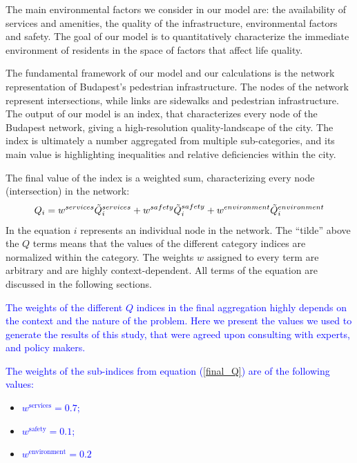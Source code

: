 The main environmental factors we consider in our model are: the availability of services and amenities, the quality of the infrastructure, environmental factors and safety. The goal of our model is to quantitatively characterize the immediate environment of residents in the space of factors that affect life quality.

The fundamental framework of our model and our calculations is the network representation of Budapest’s pedestrian infrastructure. The nodes of the network represent intersections, while links are sidewalks and pedestrian infrastructure. The output of our model is an index, that characterizes every node of the Budapest network, giving a high-resolution quality-landscape of the city. The index is ultimately a number aggregated from multiple sub-categories, and its main value is highlighting inequalities and relative deficiencies within the city.

The final value of the index is a weighted sum, characterizing every node (intersection) in the network:
\begin{equation} \label{final_Q}
	Q_i =w^{services}\Tilde{Q}_i^{services} + w^{safety} \Tilde{Q}_i^{safety} + w^{environment}\Tilde{Q}_i^{environment}
\end{equation}
In the equation $i$ represents an individual node in the network. The ``tilde'' above the $Q$ terms means that the values of the different category indices are normalized within the category. The weights $w$ assigned to every term are arbitrary and are highly context-dependent. All terms of the equation are discussed in the following sections.

\textcolor{blue}{The weights of the different $Q$ indices in the final aggregation highly depends on the context and the nature of the problem. Here we present the values we used to generate the results of this study, that were agreed upon consulting with experts, and policy makers.}

\textcolor{blue}{The weights of the sub-indices from equation (\ref{final_Q}) are of the following values:}

\begin{itemize}
  \item \textcolor{blue}{$w^{\text{services}}=0.7$;}
  \item \textcolor{blue}{$w^{\text{safety}}=0.1$;}
  \item \textcolor{blue}{$w^{\text{environment}}=0.2$}
\end{itemize}

